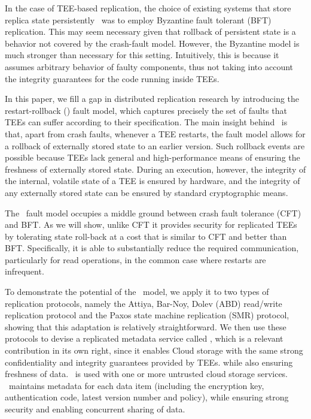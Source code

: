 In the case of \ac{TEE}-based replication, the choice of existing systems
that store replica state persistently~\cite{teechain,rote} was to
employ Byzantine fault tolerant (BFT) replication. This may seem
necessary given that rollback of persistent state is a behavior not
covered by the crash-fault model.  However, the Byzantine model is
much stronger than necessary for this setting. Intuitively, this
is because it assumes arbitrary behavior of
faulty components, thus not taking into account the integrity
guarantees for the code running inside \acp{TEE}.

In this paper, we fill a gap in distributed replication research by
introducing the restart-rollback (\faultmodel) fault model, which
captures precisely the set of faults that \acp{TEE} can suffer according to
their specification.  The main insight behind \faultmodel\ is that,
apart from crash faults, whenever a \ac{TEE} restarts, the fault model
allows for a rollback of externally stored state to an earlier
version.  Such rollback events are possible because \acp{TEE} lack general
and high-performance means of ensuring the freshness of externally
stored state.  During an execution, however, the integrity of the
internal, volatile state of a \ac{TEE} is ensured by hardware, and the
integrity of any externally stored state can be ensured by standard
cryptographic means.

The \faultmodel\ fault model occupies a middle ground between crash
fault tolerance (CFT) and BFT. As we will show, unlike CFT it provides
security for replicated \acp{TEE} by tolerating state roll-back at a cost
that is similar to CFT and better than BFT. Specifically, it is able
to substantially reduce the required communication, particularly for
read operations, in the common case where restarts are
infrequent.

To demonstrate the potential of the \faultmodel\ model, we apply it to
two types of replication protocols, namely the Attiya, Bar-Noy, Dolev
(ABD) read/write replication protocol and the Paxos
state machine replication (SMR)
protocol, showing that this adaptation is relatively straightforward.
We then use these protocols to devise a replicated metadata service
called \sys, which is a relevant contribution in its own right, since
it enables Cloud storage with the same strong confidentiality and
integrity guarantees provided by \acp{TEE}. while also ensuring freshness
of data.
\sys\ is used with one or more untrusted cloud storage
services. \sys\ maintains metadata for each data item (including the
encryption key, authentication code, latest version number and
policy), while ensuring strong security and enabling concurrent
sharing of data.

